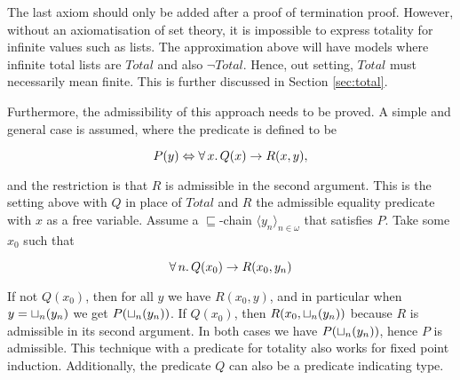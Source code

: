 The last axiom should only be added after a proof of termination
proof. However, without an axiomatisation of set theory, it is
impossible to express totality for infinite values such as lists. The
approximation above will have models where infinite total lists are
$Total$ and also $\neg Total$. Hence, out setting, $Total$ must
necessarily mean finite. This is further discussed in Section
\ref{sec:total}.

\pagebreak
Furthermore, the admissibility of this approach needs to be proved. A
simple and general case is assumed, where the predicate is defined to
be

$$P(y) \Leftrightarrow \forall \, x . \, Q(x) \rightarrow R(x,y),$$

\noindent
and the restriction is that $R$ is admissible in the second
argument. This is the setting above with $Q$ in place of $Total$ and
$R$ the admissible equality predicate with $x$ as a free
variable. Assume a $\sqsubseteq$-chain $\langle y_n
\rangle_{n\in\omega}$ that satisfies $P$. Take some $x_0$ such that

$$\forall \, n . \, Q(x_0) \rightarrow R(x_0,y_n)$$

If not $Q(x_0)$, then for all $y$ we have $R(x_0,y)$, and in
particular when $y=\sqcup_{n}(y_n)$ we get $P(\sqcup_{n}(y_n))$. If
$Q(x_0)$, then $R(x_0,\sqcup_{n}(y_n))$ because $R$ is admissible in its
second argument. In both cases we have $P(\sqcup_{n}(y_n))$, hence $P$
is admissible. This technique with a predicate for totality also works
for fixed point induction. Additionally, the predicate $Q$ can also be a
predicate indicating type.
